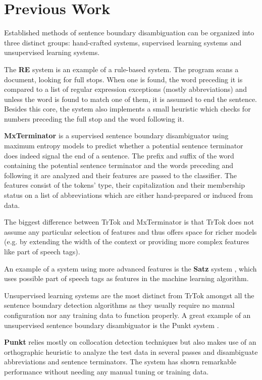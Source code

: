 \section{Previous Work}
\label{sec:previous-work}

Established methods of sentence boundary disambiguation can be
organized into three distinct groups: hand-crafted systems, supervised
learning systems and unsupervised learning systems.

The \textbf{RE} system \cite{sbd-re} is an example of a rule-based
system. The program scans a document, looking for full stops. When one
is found, the word preceding it is compared to a list of regular
expression exceptions (mostly abbreviations) and unless the word is
found to match one of them, it is assumed to end the sentence. Besides
this core, the system also implements a small heuristic which checks
for numbers preceding the full stop and the word following it.

\textbf{MxTerminator} \cite{sbd-mxterm} is a supervised sentence
boundary disambiguator using maximum entropy models to predict whether
a potential sentence terminator does indeed signal the end of a
sentence. The prefix and suffix of the word containing the potential
sentence terminator and the words preceding and following it are
analyzed and their features are passed to the classifier. The features
consist of the tokens' type, their capitalization and their membership
status on a list of abbreviations which are either hand-prepared or
induced from data.

The biggest difference between TrTok and MxTerminator is that TrTok
does not assume any particular selection of features and thus offers
space for richer models (e.g. by extending the width of the context or
providing more complex features like part of speech tags).

An example of a system using more advanced features is the
\textbf{Satz} system \cite{sbd-satz}, which uses possible part of
speech tags as features in the machine learning algorithm.

Unsupervised learning systems are the most distinct from TrTok amongst
all the sentence boundary detection algorithms as they usually require
no manual configuration nor any training data to function properly. A
great example of an unsupervised sentence boundary disambiguator is
the Punkt system \cite{sbd-punkt}.

\textbf{Punkt} relies mostly on collocation detection techniques but
also makes use of an orthographic heuristic to analyze the test data
in several passes and disambiguate abbreviations and sentence
terminators. The system has shown remarkable performance without
needing any manual tuning or training data.
